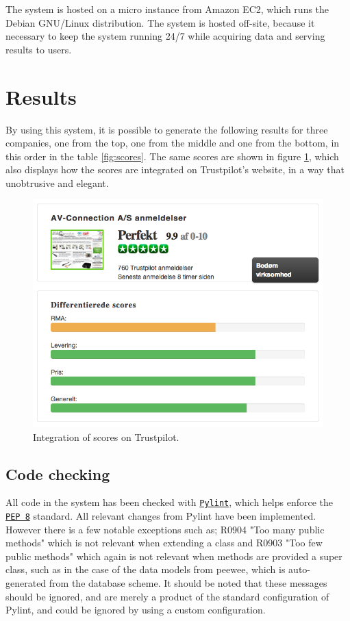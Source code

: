 \documentclass[10pt]{IEEEtran}
\begin{document}
The system is hosted on a micro instance from Amazon EC2, which runs the Debian GNU/Linux distribution. The system is hosted off-site, because it necessary to keep the system running 24/7 while acquiring data and serving results to users.

\section{Results}
By using this system, it is possible to generate the following results for three companies, one from the top, one from the middle and one from the bottom, in this order in the table \ref{fig:scores}.
The same scores are shown in figure \ref{fig:scores_gui}, which also displays how the scores are integrated on Trustpilot's website, in a way that unobtrusive and elegant.

\begin{figure}[h!]
	\centering
	\includegraphics[scale=0.37]{scores.png}
	\caption{Integration of scores on Trustpilot. \label{fig:scores_gui}}
\end{figure}

\newpage
\subsection{Code checking}
All code in the system has been checked with \href{http://www.pylint.org/}{\texttt{Pylint}}, which helps enforce the \href{http://www.python.org/dev/peps/pep-0008/}{\texttt{PEP 8}} standard. All relevant changes from Pylint have been implemented. However there is a few notable exceptions such as; R0904 "Too many public methods" which is not relevant when extending a class and R0903 "Too few public methods" which again is not relevant when methods are provided a super class, such as in the case of the data models from peewee, which is auto-generated from the database scheme. It should be noted that these messages should be ignored, and are merely a product of the standard configuration of Pylint, and could be ignored by using a custom configuration.
\end{document}
